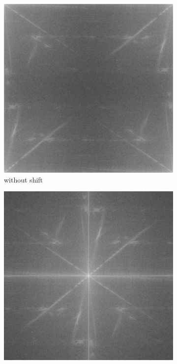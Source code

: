 \documentclass[
	12pt, %
]{style/fphw}
\begin{document}
\begin{figure}[H]
     \centering
     \begin{subfigure}[b]{0.3\textwidth}
         \centering
         \includegraphics[width=\textwidth]{plots2/Q5_1_spectrum_noshift.png}
         \caption{without shift}
         \label{Q5_2_lowpass_30_error.tif}
     \end{subfigure}
     \hfill
     \begin{subfigure}[b]{0.3\textwidth}
         \centering
         \includegraphics[width=\textwidth]{plots2/Q5_1_spectrum.png}

\end{subfigure}
\end{figure}
\end{document}

